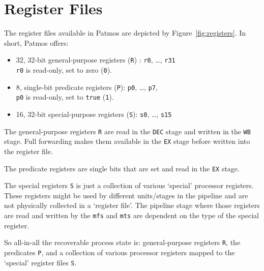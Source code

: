 \documentclass[a4paper,fontsize=10pt,twoside,DIV15,BCOR12mm,headinclude=true,footinclude=false,pagesize,bibtotoc]{scrbook}
\newcommand{\code}[1]{{\texttt{#1}}}
\newcommand{\comment}[3]{

\textsf{\textbf{#1}} {\color{#3}#2}}
\newcommand{\martin}[1]{\comment{Martin}{#1}{Blue}}
\newcommand{\stefan}[1]{\comment{Stefan}{#1}{RoyalPurple}}
\renewcommand{\martin}[1]{}
\renewcommand{\stefan}[1]{}
\begin{document}



\section{Register Files}

The register files available in Patmos are depicted by
Figure~\ref{fig:registers}. In short, Patmos offers:
\begin{itemize}
  \item 32, 32-bit general-purpose registers (\texttt{R}) : \texttt{r0}, \ldots, \texttt{r31} \\
    \texttt{r0} is read-only, set to zero (\texttt{0}).
  \item 8, single-bit predicate registers (\texttt{P}): \texttt{p0}, \ldots, \texttt{p7}, \\
    \texttt{p0} is read-only, set to \texttt{true} (\texttt{1}).
  \item 16, 32-bit special-purpose registers (\texttt{S}): \texttt{s0}, \ldots, \texttt{s15}
\end{itemize}

The general-purpose registers \texttt{R} are read in the \code{DEC} stage
and written in the \code{WB} stage. Full forwarding makes them available
in the \code{EX} stage before written into the register file.

The predicate registers are single bits that are set and read in the \code{EX}
stage.

The special registers \code{S} is just a collection of various `special'
processor registers. These registers might be used by different units/stages
in the pipeline and are not physically collected in a `register file'.
The pipeline stage where those registers are read and written by the
\code{mfs} and \code{mts} are dependent on the type of the special
register.

\martin{The three `register' files shall constitute the state of the processor.
Every non-obvious register, such as method base, shall be mapped to a
`special' register. Even the current PC on an interrupt shall end up in a
register that is mapped into the special register domain.}

\stefan{Umm .. it would be really good to define somewhere in which stages which special register is actually read or written by mfs/mts
;).}

So all-in-all the recoverable process state is: general-purpose registers
\code{R}, the predicates \code{P}, and a collection of various processor
registers mapped to the `special' register files \code{S}.
\end{document}
